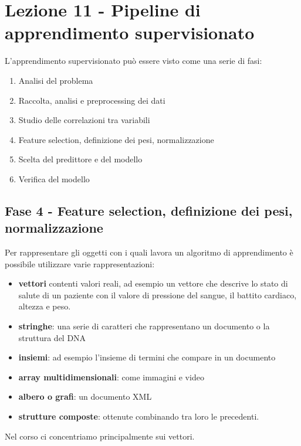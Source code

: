 \section{Lezione 11 - Pipeline di apprendimento supervisionato}\label{lezione-11---pipeline-di-apprendimento-supervisionato}

L'apprendimento supervisionato può essere visto come una serie di fasi:

\begin{enumerate}
\item
  Analisi del problema
\item
  Raccolta, analisi e preprocessing dei dati
\item
  Studio delle correlazioni tra variabili
\item
  Feature selection, definizione dei pesi, normalizzazione
\item
  Scelta del predittore e del modello
\item
  Verifica del modello
\end{enumerate}

\subsection{Fase 4 - Feature selection, definizione dei pesi, normalizzazione}\label{fase-4---feature-selection-definizione-dei-pesi-normalizzazione}

Per rappresentare gli oggetti con i quali lavora un algoritmo di apprendimento è possibile utilizzare varie rappresentazioni:

\begin{itemize}
\item
  \textbf{vettori} contenti valori reali, ad esempio un vettore che descrive lo stato di salute di un paziente con il valore di pressione del sangue, il battito cardiaco, altezza e peso.
\item
  \textbf{stringhe}: una serie di caratteri che rappresentano un documento o la struttura del DNA
\item
  \textbf{insiemi}: ad esempio l'insieme di termini che compare in un documento
\item
  \textbf{array multidimensionali}: come immagini e video
\item
  \textbf{albero o grafi}: un documento XML
\item
  \textbf{strutture composte}: ottenute combinando tra loro le
  precedenti.
\end{itemize}

Nel corso ci concentriamo principalmente sui vettori.

